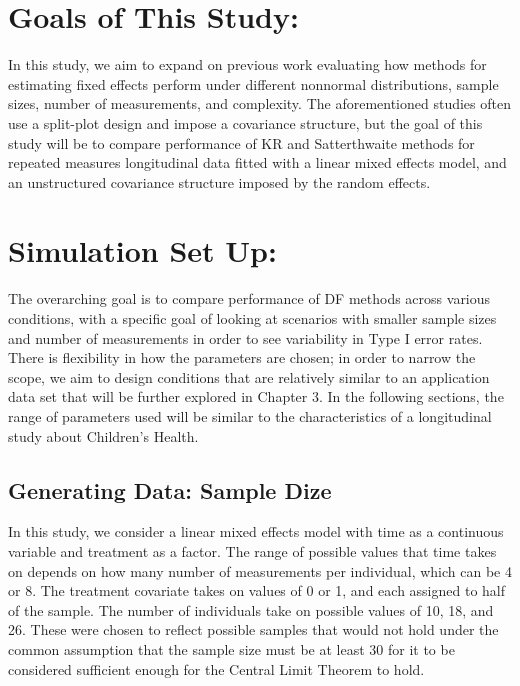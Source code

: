 \documentclass[12pt, twoside]{amherstthesis}
\begin{document}
\hypertarget{goals-of-this-study}{%
\section{Goals of This Study:}\label{goals-of-this-study}}

In this study, we aim to expand on previous work evaluating how methods for estimating fixed effects perform under different nonnormal distributions, sample sizes, number of measurements, and complexity. The aforementioned studies often use a split-plot design and impose a covariance structure, but the goal of this study will be to compare performance of KR and Satterthwaite methods for repeated measures longitudinal data fitted with a linear mixed effects model, and an unstructured covariance structure imposed by the random effects.

\hypertarget{simulation-set-up}{%
\section{Simulation Set Up:}\label{simulation-set-up}}

The overarching goal is to compare performance of DF methods across various conditions, with a specific goal of looking at scenarios with smaller sample sizes and number of measurements in order to see variability in Type I error rates. There is flexibility in how the parameters are chosen; in order to narrow the scope, we aim to design conditions that are relatively similar to an application data set that will be further explored in Chapter 3. In the following sections, the range of parameters used will be similar to the characteristics of a longitudinal study about Children's Health.

\hypertarget{generating-data-sample-dize}{%
\subsection{Generating Data: Sample Dize}\label{generating-data-sample-dize}}

In this study, we consider a linear mixed effects model with time as a continuous variable and treatment as a factor. The range of possible values that time takes on depends on how many number of measurements per individual, which can be 4 or 8. The treatment covariate takes on values of 0 or 1, and each assigned to half of the sample. The number of individuals take on possible values of 10, 18, and 26. These were chosen to reflect possible samples that would not hold under the common assumption that the sample size must be at least 30 for it to be considered sufficient enough for the Central Limit Theorem to hold.
\end{document}
